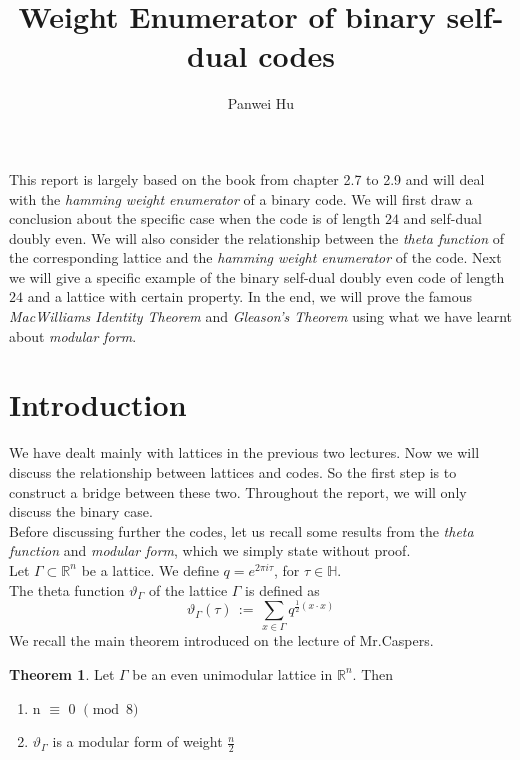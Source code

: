 \documentclass[12pt]{article}
\title{Weight Enumerator of binary self-dual codes}
\author{Panwei Hu}
\theoremstyle{definition}
\newtheorem{theorem}{Theorem}[section]
\numberwithin{equation}{theorem}
\numberwithin{figure}{theorem}
\newcommand{\thetaFunction}[1]{\ensuremath{\vartheta_{#1}}}
\newcommand{\Real}{\ensuremath{\mathbb{R}}}
\newcommand{\imaginary}{\ensuremath{i}}
\newcommand{\HalfPlane}{\ensuremath{\mathbb{H}}}
\begin{document}
  \maketitle
  \newpage

\tableofcontents
	\newpage
  \newpage
\newpage

This report is largely based on the book \cite{ebeling2013lattices} from chapter 2.7 to 2.9 and will deal with the \emph{hamming weight enumerator} of a binary code. We will first draw a conclusion about the specific case when the code is of length $24$ and self-dual doubly even. We will also consider the relationship between the \emph{theta function} of the corresponding lattice and the \emph{hamming weight enumerator} of the code. Next we will give a specific example of the binary self-dual doubly even code of length $24$ and a lattice with certain property. In the end, we will prove the famous \emph{MacWilliams Identity Theorem} and \emph{Gleason's Theorem} using what we have learnt about \emph{modular form}.
\section{Introduction}
We have dealt mainly with lattices in the previous two lectures. Now we will discuss the relationship between lattices and codes. So the first step is to construct a bridge between these two. Throughout the report, we will only discuss the binary case.\\
Before discussing further the codes, let us recall some results from the \emph{theta function} and \emph{modular form}, which we simply state without proof.\\
Let $\Gamma \subset \Real^n$ be a lattice. We define $q = e^{2\pi\imaginary\tau}$, for $\tau \in \HalfPlane$.\\
The theta function $\thetaFunction{\Gamma}$ of the lattice $\Gamma$ is defined as 
\[
	\thetaFunction{\Gamma}(\tau) \, := \,\sum_{x \in \Gamma} q^{\frac{1}{2}(x\cdot x)} 
\] 
We recall the main theorem introduced on the lecture of Mr.Caspers. 
\begin{theorem}\label{evenUniLattice}
Let $\Gamma$ be an even unimodular lattice in $\Real^n$. Then
\begin{enumerate}
	\item n $\equiv$ 0 $\pmod 8$
	\item {\thetaFunction{\Gamma}} is a modular form of weight $\frac{n}{2}$
\end{enumerate}
\end{theorem}
\end{document}
